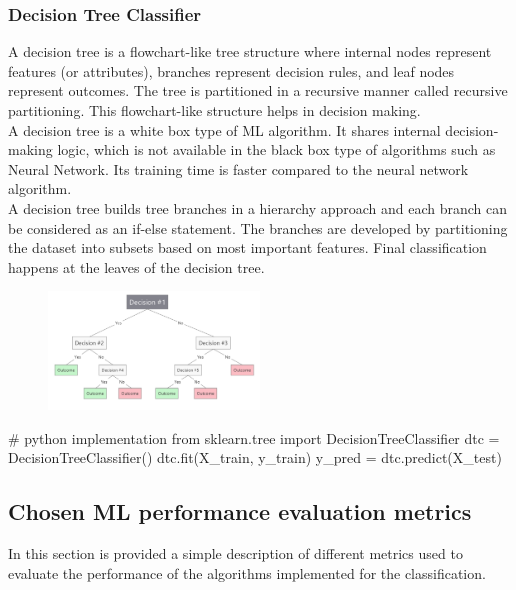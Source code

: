 \documentclass{article}
\begin{document}
\subsubsection*{Decision Tree Classifier}
\begin{multicols}{2}
 \columnbreak
A decision tree is a flowchart-like tree structure where internal nodes represent features (or attributes), branches represent decision rules, and leaf nodes represent outcomes. The tree is partitioned in a recursive manner called recursive partitioning. This flowchart-like structure helps in decision making.\\A decision tree is a white box type of ML algorithm. It shares internal decision-making logic, which is not available in the black box type of algorithms such as Neural Network. Its training time is faster compared to the neural network algorithm.\\ A decision tree builds tree branches in a hierarchy approach and each branch can be considered as an if-else statement. The branches are developed by partitioning the dataset into subsets based on most important features. Final classification happens at the leaves of the decision tree.
\begin{figure}[H]
        \begin{center}
        \includegraphics[width=0.5\textwidth]{DecTree.png}
        \end{center}
    \end{figure} 
\end{multicols}
\begin{center}
\begin{Python}
# python implementation 
from sklearn.tree import DecisionTreeClassifier
dtc = DecisionTreeClassifier()
dtc.fit(X_train, y_train)
y_pred = dtc.predict(X_test)
\end{Python}
\end{center}


\subsection{Chosen ML performance evaluation metrics} \label{sec:performances}
In this section is provided a simple description of different metrics used to evaluate the performance of the algorithms implemented for the classification. 
\end{document}
